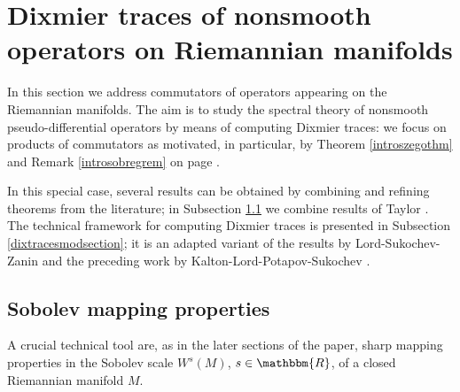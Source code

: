 \documentclass[10pt]{amsart}
\theoremstyle{remark}
\theoremstyle{definition}
\begin{document}
\large
\section{Dixmier traces of nonsmooth operators on Riemannian manifolds}
\label{introseconriemannain}
\normalsize

In this section we address commutators of operators appearing on the Riemannian manifolds. The aim is to study the spectral theory of nonsmooth pseudo-differential operators by means of computing Dixmier traces: we focus on products of commutators as motivated, in particular, by Theorem \ref{introszegothm} and Remark \ref{introsobregrem} on page \pageref{introszegothm}. 

In this special case, several results can be obtained by combining and refining theorems from the literature; in Subsection \ref{subsectiononsobmapping} we combine results of Taylor \cite{nlin,toolspde,hbcom}. The technical framework for computing Dixmier traces is presented in Subsection \ref{dixtracesmodsection}; it is an adapted variant of the results by Lord-Sukochev-Zanin \cite{sukolord} and the preceding work by Kalton-Lord-Potapov-Sukochev \cite{kaloposu}.

\subsection{Sobolev mapping properties}
\label{subsectiononsobmapping}
A crucial technical tool are, as in the later sections of the paper, sharp mapping properties in the Sobolev scale $W^s(M)$, $s\in {\mathbbm{R}}$, of a closed Riemannian manifold $M$. 
\end{document}
